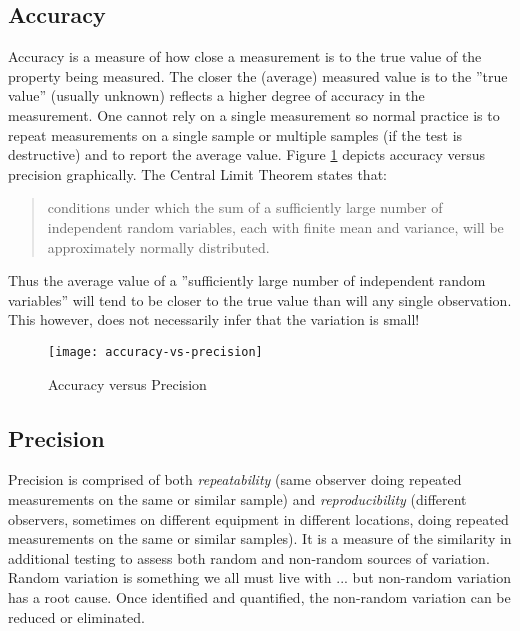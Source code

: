 \subsection{Accuracy}
Accuracy is a measure of how close a measurement is to the true value of the property being measured.  The closer the (average) measured value is to the ''true value'' (usually unknown) reflects a higher degree of accuracy in the measurement.  One cannot rely on a single measurement so normal practice is to repeat measurements on a single sample or multiple samples (if the test is destructive) and to report the average value. Figure \ref{fig1} depicts accuracy versus precision graphically. The Central Limit Theorem states that:
\begin{quote}
conditions under which the sum of a sufficiently large number of independent random variables, each with finite mean and variance, will be approximately normally distributed.\cite{rice1995mathematical} 
\end{quote}
Thus the average value of a ''sufficiently large number of independent random variables'' will tend to be closer to the true value than will any single observation.  This however, does not necessarily infer that the variation is small!

\begin{figure}[h]\caption{Accuracy versus Precision}\label{fig1}
\begin{center}
\texttt{[image: accuracy-vs-precision]}
\end{center}
\end{figure}

\subsection{Precision}
Precision is comprised of both \textit{repeatability} (same observer doing repeated measurements on the same or similar sample) and \textit{reproducibility} (different observers, sometimes on different equipment in different locations, doing repeated measurements on the same or similar samples).  It is a measure of the similarity in additional testing to assess both random and non-random sources of variation.  Random variation is something we all must live with ... but non-random variation has a root cause.  Once identified and quantified, the non-random variation can be reduced or eliminated.

